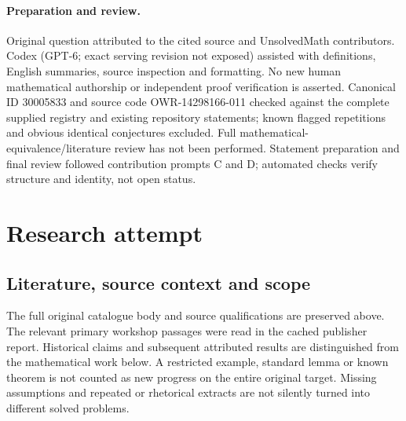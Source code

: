 \documentclass[11pt]{article}
\begin{document}
\paragraph{Preparation and review.}
Original question attributed to the cited source and UnsolvedMath contributors. Codex (GPT-6; exact serving revision not exposed) assisted with definitions, English summaries, source inspection and formatting. No new human mathematical authorship or independent proof verification is asserted. Canonical ID 30005833 and source code OWR-14298166-011 checked against the complete supplied registry and existing repository statements; known flagged repetitions and obvious identical conjectures excluded. Full mathematical-equivalence/literature review has not been performed. Statement preparation and final review followed contribution prompts C and D; automated checks verify structure and identity, not open status.
\label{end:30005833}

\section{Research attempt}
\subsection{Literature, source context and scope}
The full original catalogue body and source qualifications are preserved above. The relevant primary workshop passages were read in the cached publisher report. Historical claims and subsequent attributed results are distinguished from the mathematical work below. A restricted example, standard lemma or known theorem is not counted as new progress on the entire original target. Missing assumptions and repeated or rhetorical extracts are not silently turned into different solved problems.
\end{document}
